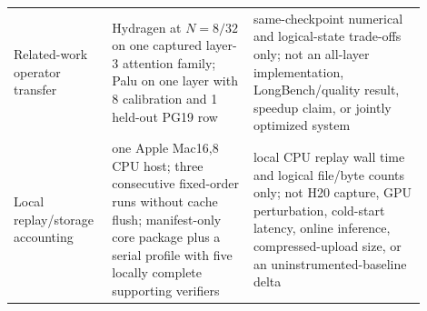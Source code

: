 \documentclass{article}
\begin{document}
\begin{longtable}{@{}>{\raggedright\arraybackslash}p{0.19\linewidth}>{\raggedright\arraybackslash}p{0.32\linewidth}>{\raggedright\arraybackslash}p{0.39\linewidth}@{}}
  Related-work operator transfer & Hydragen at $N=8/32$ on one captured layer-3 attention family; Palu on one layer with 8 calibration and 1 held-out PG19 row & same-checkpoint numerical and logical-state trade-offs only; not an all-layer implementation, LongBench/quality result, speedup claim, or jointly optimized system \\
  Local replay/storage accounting & one Apple Mac16,8 CPU host; three consecutive fixed-order runs without cache flush; manifest-only core package plus a serial profile with five locally complete supporting verifiers & local CPU replay wall time and logical file/byte counts only; not H20 capture, GPU perturbation, cold-start latency, online inference, compressed-upload size, or an uninstrumented-baseline delta \\
\end{longtable}
\endgroup
\end{document}
